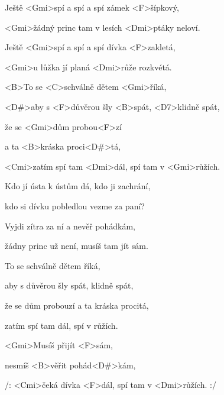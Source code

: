 

\zs
Ještě <Gmi>spí a spí a spí zámek <F>šípkový,

<Gmi>žádný princ tam v lesích <Dmi>ptáky neloví.

Ještě <Gmi>spí a spí a spí dívka <F>zakletá,

<Gmi>u lůžka jí planá <Dmi>růže rozkvétá.

<B>To se <C>schválně dětem <Gmi>říká,

<D#>aby s <F>důvěrou šly <B>spát, <D7>klidně spát,

že se <Gmi>dům probou<F>zí

a ta <B>kráska proci<D#>tá,

<Cmi>zatím spí tam <Dmi>dál, spí tam v <Gmi>růžích.
\ks

\zs
Kdo jí ústa k ústům dá, kdo ji zachrání,

kdo si dívku pobledlou vezme za paní?

Vyjdi zítra za ní a nevěř pohádkám,

žádny princ už není, musíš tam jít sám.

To se schválně dětem říká,

aby s důvěrou šly spát, klidně spát,

že se dům probouzí a ta kráska procitá,

zatím spí tam dál, spí v růžích.
\ks

\zs
<Gmi>Musíš přijít <F>sám,

nesmíš <B>věřit pohád<D#>kám,

/: <Cmi>čeká dívka <F>dál, spí tam v <Dmi>růžích. :/
\ks

\kp
